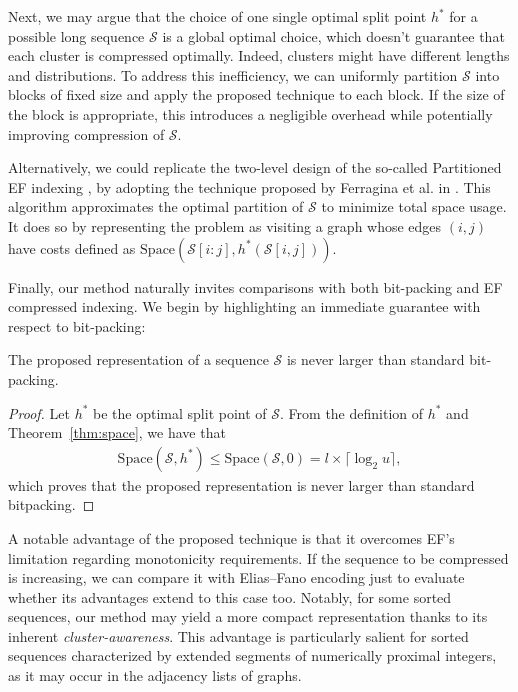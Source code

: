 Next, we may argue that the choice of one single optimal split point $h^*$ for a possible long sequence $\mathcal S$ is a global optimal choice, which doesn't guarantee that each cluster is compressed optimally. Indeed, clusters might have different lengths and distributions. To address this inefficiency, we can uniformly partition $\mathcal S$ into blocks of fixed size and apply the proposed technique to each block. If the size of the block is appropriate, this introduces a negligible overhead while potentially improving compression of $\mathcal S$.

Alternatively, we could replicate the two-level design of the so-called Partitioned EF indexing \cite{PartitionedEF}, by adopting the technique proposed by Ferragina et al. in \cite{optimallypartitioning}.  This algorithm approximates the optimal partition of $\mathcal S$ to minimize total space usage. It does so by representing the problem as visiting a graph whose edges $(i, j)$ have costs defined as $\mathrm{Space}(\mathcal S[i:j], h^*(\mathcal S[i,j]))$.



Finally, our method naturally invites comparisons with both bit-packing and EF compressed indexing. We begin by highlighting an immediate guarantee with respect to bit-packing:
\begin{theorem}
The proposed representation of a sequence $\mathcal S$ is never larger than standard bit-packing.
\end{theorem}
\begin{proof}    
    Let $h^*$ be the optimal split point of $\mathcal S$. From the definition of $h^*$ and Theorem~\ref{thm:space}, we have that
    \begin{equation*}
        \begin{aligned}
        \mathrm{Space}(\mathcal{S}, h^*) \leq \mathrm{Space}(\mathcal{S}, 0) = l \times \lceil \log_2 u \rceil,
        \end{aligned}
    \end{equation*}
    which proves that the proposed representation is never larger than standard bitpacking.
\end{proof}


A notable advantage of the proposed technique is that it overcomes EF's limitation regarding monotonicity requirements. If the sequence to be compressed is increasing, we can compare it with Elias–Fano encoding just to evaluate whether its advantages extend to this case too. Notably, for some sorted sequences, our method may yield a more compact representation thanks to its inherent \emph{cluster-awareness}. This advantage is particularly salient for sorted sequences characterized by extended segments of numerically proximal integers, as it may occur in the adjacency lists of graphs.


